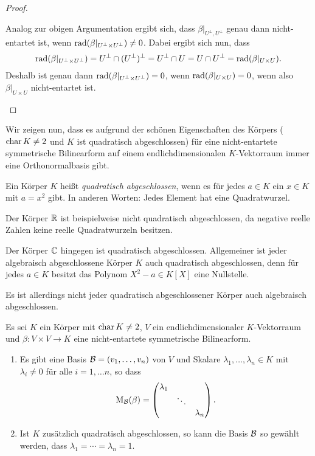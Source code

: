 \documentclass[a4paper,10pt,numbers=noenddot]{scrartcl}
\begin{document}
\begin{proof}
\begin{enumerate}[leftmargin=*]
      Analog zur obigen Argumentation ergibt sich, dass $\beta|_{U^\perp, U^\perp}$ genau dann nicht-entartet ist, wenn $\operatorname{rad}(\beta|_{U^\perp \times U^\perp}) \neq 0$.
      Dabei ergibt sich nun, dass
      \[
          \operatorname{rad}(\beta|_{U^\perp \times U^\perp})
        = U^\perp \cap (U^\perp)^\perp
        = U^\perp \cap U
        = U \cap U^\perp
        = \operatorname{rad}(\beta|_{U \times U}).
      \]
      Deshalb ist genau dann $\operatorname{rad}(\beta|_{U^\perp \times U^\perp}) = 0$, wenn $\operatorname{rad}(\beta|_{U \times U}) = 0$, wenn also $\beta|_{U \times U}$ nicht-entartet ist.
    \qedhere
  \end{enumerate}
\end{proof}


Wir zeigen nun, dass es aufgrund der schönen Eigenschaften des Körpers ($\operatorname{char} K \neq 2$ und $K$ ist quadratisch abgeschlossen) für eine nicht-entartete symmetrische Bilinearform auf einem endlichdimensionalen $K$-Vektorraum immer eine Orthonormalbasis gibt.


\begin{remark}
  Ein Körper $K$ heißt \emph{quadratisch abgeschlossen}, wenn es für jedes $a \in K$ ein $x \in K$ mit $a = x^2$ gibt.
  In anderen Worten:
  Jedes Element hat eine Quadratwurzel.
  
  Der Körper $\mathbb{R}$ ist beispielweise nicht quadratisch abgeschlossen, da negative reelle Zahlen keine reelle Quadratwurzeln besitzen.
  
  Der Körper $\mathbb{C}$ hingegen ist quadratisch abgeschlossen.
  Allgemeiner ist jeder algebraisch abgeschlossene Körper $K$ auch quadratisch abgeschlossen, denn für jedes $a \in K$ besitzt das Polynom $X^2 - a \in K[X]$ eine Nullstelle.
  
  Es ist allerdings nicht jeder quadratisch abgeschlossener Körper auch algebraisch abgeschlossen.
\end{remark}



\begin{theorem}\label{thrm: existence of orthonormalbases}
  Es sei $K$ ein Körper mit $\operatorname{char} K \neq 2$, $V$ ein endlichdimensionaler $K$-Vektorraum und $\beta \colon V \times V \to K$ eine nicht-entartete symmetrische Bilinearform.
  \begin{enumerate}[leftmargin=*]
    \item
      Es gibt eine Basis $\mathcal{B} = (v_1, \dotsc, v_n)$ von $V$ und Skalare $\lambda_1, \dotsc, \lambda_n \in K$ mit $\lambda_i \neq 0$ für alle $i = 1, \dotsc n$, so dass
      \[
        \operatorname{M}_{\mathcal{B}}(\beta)
        =
        \begin{pmatrix}
          \lambda_1 &         &             \\
                    & \ddots  &             \\
                    &         & \lambda_n
        \end{pmatrix}.
      \]
    \item
      Ist $K$ zusätzlich quadratisch abgeschlossen, so kann die Basis $\mathcal{B}$ so gewählt werden, dass $\lambda_1 = \dotsb = \lambda_n = 1$.
  \end{enumerate}
\end{theorem}
\end{document}
